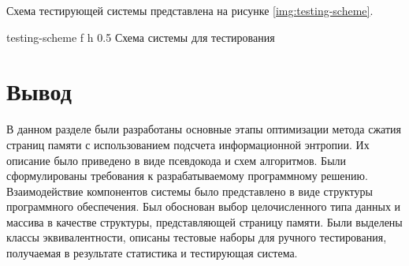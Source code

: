Схема тестирующей системы представлена на рисунке \ref{img:testing-scheme}.

    {testing-scheme}
    {f}
    {h}
    {0.5\textwidth}
    {Схема системы для тестирования}

\section*{Вывод}

В данном разделе были разработаны основные этапы оптимизации метода сжатия страниц памяти с использованием подсчета информационной энтропии. Их описание было приведено в виде псевдокода и схем алгоритмов. Были сформулированы требования к разрабатываемому программному решению. Взаимодействие компонентов системы было представлено в виде структуры программного обеспечения. Был обоснован выбор целочисленного типа данных и массива в качестве структуры, представляющей страницу памяти. Были выделены классы эквивалентности, описаны тестовые наборы для ручного тестирования, получаемая в результате статистика и тестирующая система.

